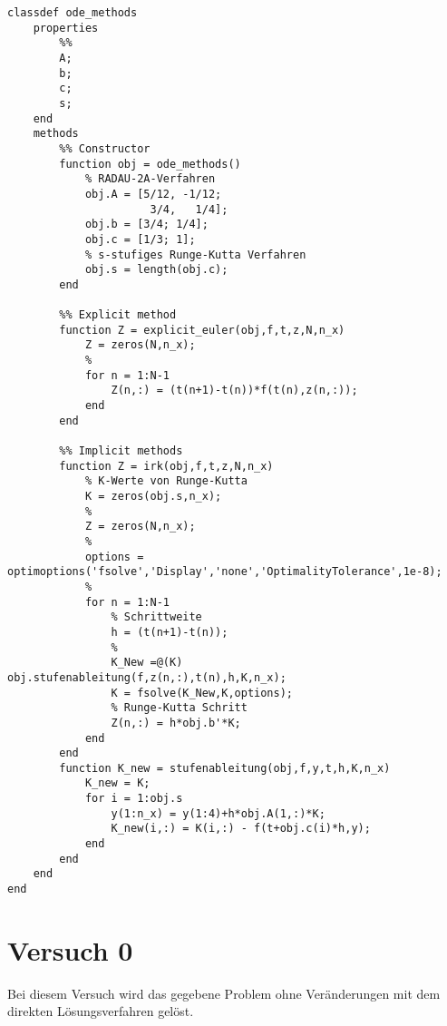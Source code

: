 \begin{lstlisting}[style=num_octave, caption={Matlab Programmcode von \texttt{ode\_methods.m}.}, label=code:direct_odemethods]
classdef ode_methods
    properties
        %% 
        A;
        b;
        c;
        s;
    end
    methods
        %% Constructor
        function obj = ode_methods()
            % RADAU-2A-Verfahren
            obj.A = [5/12, -1/12;
                      3/4,   1/4];
            obj.b = [3/4; 1/4];
            obj.c = [1/3; 1];
            % s-stufiges Runge-Kutta Verfahren
            obj.s = length(obj.c); 
        end
        
        %% Explicit method
        function Z = explicit_euler(obj,f,t,z,N,n_x)
            Z = zeros(N,n_x);
            % 
            for n = 1:N-1
                Z(n,:) = (t(n+1)-t(n))*f(t(n),z(n,:));
            end
        end
        
        %% Implicit methods
        function Z = irk(obj,f,t,z,N,n_x)
            % K-Werte von Runge-Kutta
            K = zeros(obj.s,n_x);
            % 
            Z = zeros(N,n_x);
            % 
            options = optimoptions('fsolve','Display','none','OptimalityTolerance',1e-8);
            % 
            for n = 1:N-1
                % Schrittweite
                h = (t(n+1)-t(n));
                % 
                K_New =@(K) obj.stufenableitung(f,z(n,:),t(n),h,K,n_x);
                K = fsolve(K_New,K,options);
                % Runge-Kutta Schritt
                Z(n,:) = h*obj.b'*K;
            end
        end
        function K_new = stufenableitung(obj,f,y,t,h,K,n_x)
            K_new = K;
            for i = 1:obj.s
                y(1:n_x) = y(1:4)+h*obj.A(1,:)*K;
                K_new(i,:) = K(i,:) - f(t+obj.c(i)*h,y);
            end
        end
    end
end
\end{lstlisting}













\newpage
\section{Versuch 0}\label{kap:Versuch0}
Bei diesem Versuch wird das gegebene Problem ohne Veränderungen mit dem direkten Lösungsverfahren gelöst.

